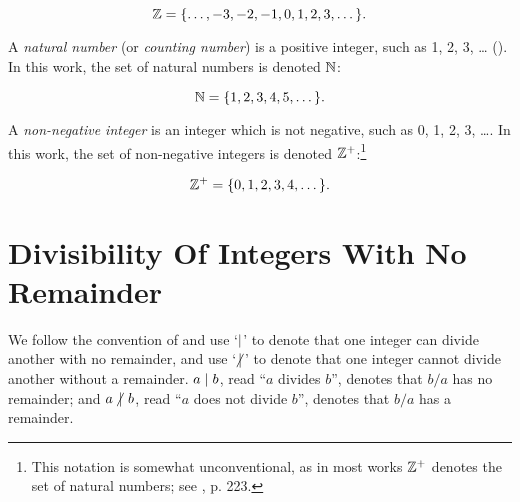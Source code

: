\begin{equation}
{\mathbb{Z}} = \{ \ldots{} , -3, -2, -1, 0, 1, 2, 3, \ldots{} \}.
\end{equation}

A \emph{natural number}
 (or \emph{counting number})
is a positive integer,
such as 1, 2, 3, \ldots{} (\cite{bibref:b:penguindictionaryofmathematics:2ded}).
In this work, the set of natural numbers is denoted
${\mathbb{N}}$:

\begin{equation}
{\mathbb{N}} = \{ 1, 2, 3, 4, 5, \ldots{} \}.
\end{equation}

A \emph{non-negative integer}
is an integer which is not negative,
such as 0, 1, 2, 3, \ldots{}.  In this work, the set of non-negative
integers is denoted ${\mathbb{Z}^+}$:\footnote{This notation is
somewhat unconventional, as in most works ${\mathbb{Z}^+}$ denotes
the set of natural numbers; see \cite{bibref:b:penguindictionaryofmathematics:2ded},
p. 223.}

\begin{equation}
{\mathbb{Z}^+} = \{ 0, 1, 2, 3, 4, \ldots{} \}.
\end{equation}

\section{Divisibility Of Integers With No Remainder}
\label{cpri0:doi0}

We follow the convention of \cite{bibref:b:HardyAndWrightClassic}
and use `$\mid$'
to denote that one integer can divide
another with no remainder, and use `$\hspace{-0.125em}\not\hspace{0.245em}\mid\hspace{0.135em}$' 
to denote
that one integer cannot divide another without a
remainder.  $a \mid b$, read ``$a$
divides $b$'', denotes that $b/a$ has no remainder; and
$a \hspace{-0.125em}\not\hspace{0.245em}\mid\hspace{0.135em} b$, read ``$a$ does not divide $b$'', denotes
that $b/a$ has a remainder.


